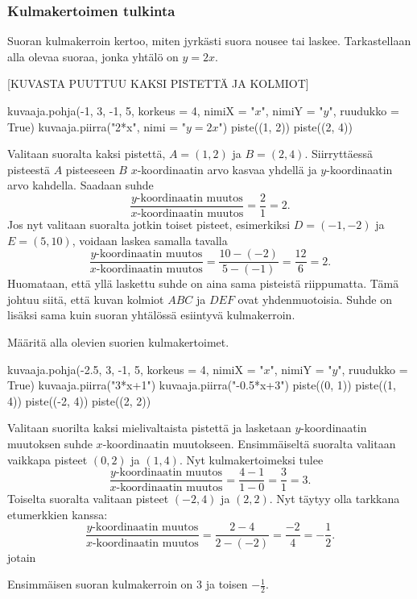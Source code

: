 \subsubsection*{Kulmakertoimen tulkinta}

Suoran kulmakerroin kertoo, miten jyrkästi suora nousee tai laskee. Tarkastellaan alla olevaa suoraa, jonka yhtälö on $y=2x$.

[KUVASTA PUUTTUU KAKSI PISTETTÄ JA KOLMIOT]

\begin{kuva}
    kuvaaja.pohja(-1, 3, -1, 5, korkeus = 4, nimiX = "$x$", nimiY = "$y$", ruudukko = True)
    kuvaaja.piirra("2*x", nimi = "$y=2x$")
    piste((1, 2))
    piste((2, 4))
\end{kuva}


Valitaan suoralta kaksi pistettä,
$A=(1, 2)$ ja $B=(2, 4)$. Siirryttäessä pisteestä $A$ pisteeseen $B$ $x$-koordinaatin arvo kasvaa yhdellä ja $y$-koordinaatin arvo kahdella. Saadaan suhde
\[
\frac{\text{$y$-koordinaatin muutos}}{\text{$x$-koordinaatin muutos}}=\frac{2}{1}=2.
\]
Jos nyt valitaan suoralta jotkin toiset pisteet, esimerkiksi $D=(-1, -2)$ ja $E=(5, 10)$, voidaan laskea samalla tavalla
\[
\frac{\text{$y$-koordinaatin muutos}}{\text{$x$-koordinaatin muutos}}=\frac{10-(-2)}{5-(-1)}=\frac{12}{6}=2.
\]
Huomataan, että yllä laskettu suhde on aina sama pisteistä riippumatta. Tämä johtuu siitä, että kuvan kolmiot $ABC$ ja $DEF$ ovat yhdenmuotoisia.
Suhde on lisäksi sama kuin suoran yhtälössä esiintyvä kulmakerroin.

\begin{esimerkki} Määritä alla olevien suorien kulmakertoimet.


\begin{kuva}
    kuvaaja.pohja(-2.5, 3, -1, 5, korkeus = 4, nimiX = "$x$", nimiY = "$y$", ruudukko = True)
    kuvaaja.piirra("3*x+1")
    kuvaaja.piirra("-0.5*x+3")
    piste((0, 1))
    piste((1, 4))
    piste((-2, 4))
    piste((2, 2))
\end{kuva}

\begin{esimratk} Valitaan suorilta kaksi mielivaltaista pistettä ja lasketaan $y$-koordinaatin muutoksen suhde $x$-koordinaatin muutokseen.
Ensimmäiseltä suoralta valitaan vaikkapa pisteet $(0, 2)$ ja $(1, 4)$. Nyt kulmakertoimeksi tulee
\[
\frac{\text{$y$-koordinaatin muutos}}{\text{$x$-koordinaatin muutos}}=\frac{4-1}{1-0}=\frac{3}{1}=3.
\]
Toiselta suoralta valitaan pisteet $(-2, 4)$ ja $(2, 2)$. Nyt täytyy olla tarkkana etumerkkien kanssa:
\[
\frac{\text{$y$-koordinaatin muutos}}{\text{$x$-koordinaatin muutos}}=\frac{2-4}{2-(-2)}=\frac{-2}{4}=-\frac{1}{2}.
\]
jotain
\end{esimratk}
\begin{esimvast}
Ensimmäisen suoran kulmakerroin on $3$ ja toisen $-\frac{1}{2}$.
\end{esimvast}
\end{esimerkki}


